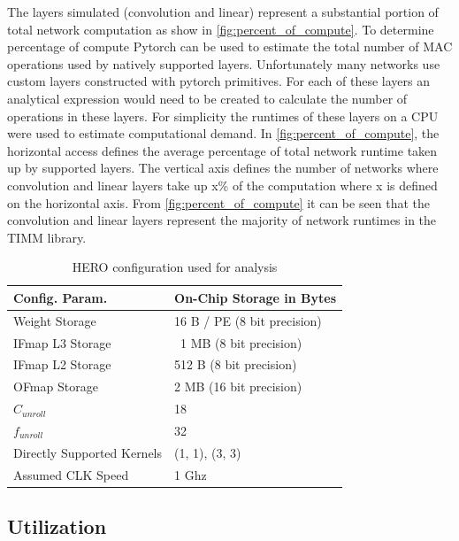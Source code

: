 The layers simulated (convolution and linear) represent a substantial portion of
total network computation as show in \autoref{fig:percent_of_compute}. 
To determine percentage of compute Pytorch can be used to estimate the
total number of MAC operations used by natively supported layers. Unfortunately
many networks use custom layers constructed with pytorch primitives. For
each of these layers an analytical expression would need to be created to calculate
the number of operations in these layers. For simplicity the runtimes
of these layers on a CPU were used to estimate computational demand. In
\autoref{fig:percent_of_compute}, the horizontal access defines the average
percentage of total network runtime taken up by supported layers. The vertical
axis defines the number of networks where convolution and linear layers take up
x\% of the computation where x is defined on the horizontal axis. From
\autoref{fig:percent_of_compute} it can be seen that the convolution and linear
layers represent the majority of network runtimes in the TIMM library. 

\begin{table}[]
    \center
    \begin{tabular}{|l|l|}
    \toprule
    Config. Param. & On-Chip Storage in Bytes    \\ 
    \midrule
    Weight Storage            & 16 B / PE (8 bit precision)  \\ \hline
    IFmap L3 Storage          & ~1 MB (8 bit precision)   \\ \hline
    IFmap L2 Storage          & 512 B (8 bit precision)   \\ \hline
    OFmap Storage             & 2 MB (16 bit precision)   \\ \hline
    $C_{unroll}$              & 18   \\ \hline
    $f_{unroll}$              & 32   \\ \hline
    Directly Supported Kernels             & {(1, 1), (3, 3)}   \\ \hline
    Assumed CLK Speed             & 1 Ghz   \\ \hline
\end{tabular}
\caption{HERO configuration used for analysis}
\label{tab:hero_config}
\end{table}

\subsection{Utilization}
\label{chap:hero:results:utilization}

